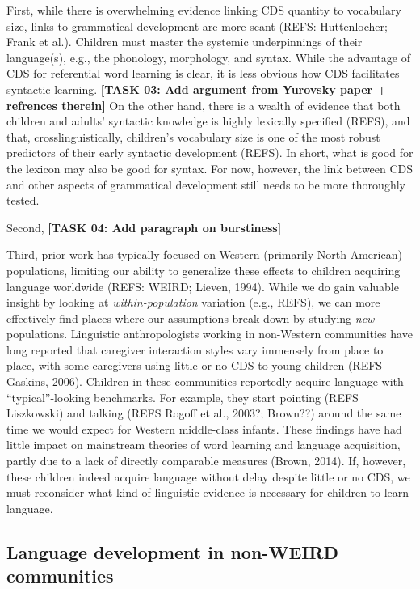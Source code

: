 \documentclass[man]{apa6}
\theoremstyle{definition}
\theoremstyle{definition}
\theoremstyle{definition}
\theoremstyle{remark}
\begin{document}
First, while there is overwhelming evidence linking CDS quantity to
vocabulary size, links to grammatical development are more scant (REFS:
Huttenlocher; Frank et al.). Children must master the systemic
underpinnings of their language(s), e.g., the phonology, morphology, and
syntax. While the advantage of CDS for referential word learning is
clear, it is less obvious how CDS facilitates syntactic learning.
\textbf{{[}TASK 03: Add argument from Yurovsky paper + refrences
therein{]}} On the other hand, there is a wealth of evidence that both
children and adults' syntactic knowledge is highly lexically specified
(REFS), and that, crosslinguistically, children's vocabulary size is one
of the most robust predictors of their early syntactic development
(REFS). In short, what is good for the lexicon may also be good for
syntax. For now, however, the link between CDS and other aspects of
grammatical development still needs to be more thoroughly tested.

Second, \textbf{{[}TASK 04: Add paragraph on burstiness{]}}

Third, prior work has typically focused on Western (primarily North
American) populations, limiting our ability to generalize these effects
to children acquiring language worldwide (REFS: WEIRD; Lieven, 1994).
While we do gain valuable insight by looking at \emph{within-population}
variation (e.g., REFS), we can more effectively find places where our
assumptions break down by studying \emph{new} populations. Linguistic
anthropologists working in non-Western communities have long reported
that caregiver interaction styles vary immensely from place to place,
with some caregivers using little or no CDS to young children (REFS
Gaskins, 2006). Children in these communities reportedly acquire
language with \enquote{typical}-looking benchmarks. For example, they
start pointing (REFS Liszkowski) and talking (REFS Rogoff et al., 2003?;
Brown??) around the same time we would expect for Western middle-class
infants. These findings have had little impact on mainstream theories of
word learning and language acquisition, partly due to a lack of directly
comparable measures (Brown, 2014). If, however, these children indeed
acquire language without delay despite little or no CDS, we must
reconsider what kind of linguistic evidence is necessary for children to
learn language.

\subsection{Language development in non-WEIRD
communities}\label{intro-nonweird}
\end{document}

